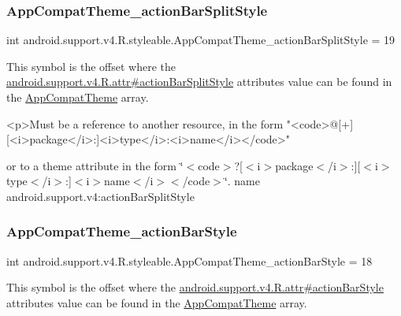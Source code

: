 \subsubsection{\texorpdfstring{App\+Compat\+Theme\+\_\+action\+Bar\+Split\+Style}{AppCompatTheme\_actionBarSplitStyle}}
{\footnotesize\ttfamily int android.\+support.\+v4.\+R.\+styleable.\+App\+Compat\+Theme\+\_\+action\+Bar\+Split\+Style = 19\hspace{0.3cm}{\ttfamily [static]}}

This symbol is the offset where the \hyperlink{classandroid_1_1support_1_1v4_1_1R_1_1attr_a442d9e8d1cd653250cbaca93d98a358b}{android.\+support.\+v4.\+R.\+attr\#action\+Bar\+Split\+Style} attribute\textquotesingle{}s value can be found in the \hyperlink{classandroid_1_1support_1_1v4_1_1R_1_1styleable_ac07ebbe62ed977f6dcaadc6397840ace}{App\+Compat\+Theme} array.

\begin{DoxyVerb}      <p>Must be a reference to another resource, in the form "<code>@[+][<i>package</i>:]<i>type</i>:<i>name</i></code>"
\end{DoxyVerb}
 or to a theme attribute in the form \char`\"{}$<$code$>$?\mbox{[}$<$i$>$package$<$/i$>$\+:\mbox{]}\mbox{[}$<$i$>$type$<$/i$>$\+:\mbox{]}$<$i$>$name$<$/i$>$$<$/code$>$\char`\"{}.  name android.\+support.\+v4\+:action\+Bar\+Split\+Style \mbox{\label{classandroid_1_1support_1_1v4_1_1R_1_1styleable_abfc7ed80904100dcd77301a5d21b8e1f}} 
\subsubsection{\texorpdfstring{App\+Compat\+Theme\+\_\+action\+Bar\+Style}{AppCompatTheme\_actionBarStyle}}
{\footnotesize\ttfamily int android.\+support.\+v4.\+R.\+styleable.\+App\+Compat\+Theme\+\_\+action\+Bar\+Style = 18\hspace{0.3cm}{\ttfamily [static]}}

This symbol is the offset where the \hyperlink{classandroid_1_1support_1_1v4_1_1R_1_1attr_ae9b3b2a13897661ab26f944cc22d5ace}{android.\+support.\+v4.\+R.\+attr\#action\+Bar\+Style} attribute\textquotesingle{}s value can be found in the \hyperlink{classandroid_1_1support_1_1v4_1_1R_1_1styleable_ac07ebbe62ed977f6dcaadc6397840ace}{App\+Compat\+Theme} array.

